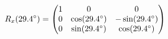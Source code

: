 \documentclass[preview]{standalone}
\begin{document}
\begin{align*}
\special{dvisvgm:raw <g id='unique000'>}R_x(29.4^\circ) = \begin{pmatrix} 1 & 0 & 0 \\ 0 & \cos(29.4^\circ) & -\sin(29.4^\circ) \\ 0 & \sin(29.4^\circ) & \cos(29.4^\circ) \end{pmatrix}\special{dvisvgm:raw </g>}
\end{align*}
\end{document}
